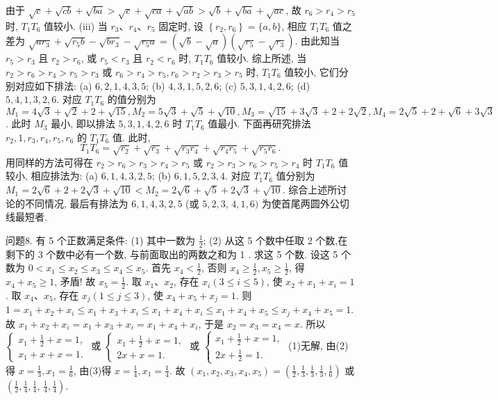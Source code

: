 由于 $\sqrt{c}+\sqrt{c b}+\sqrt{b a}>\sqrt{c}+\sqrt{c a}+\sqrt{a b}>\sqrt{b}+\sqrt{b a}+\sqrt{a c}$, 故 $r_6> r_4>r_5$ 时, $T_1 T_6$ 值较小.
(iii) 当 $r_3 、 r_4 、 r_5$ 固定时, 设 $\left\{r_2, r_6\right\}=\{a, b\}$, 相应 $T_1 T_6$ 值之差为 $\sqrt{a r_3}+\sqrt{r_5 b}-\sqrt{b r_3}-\sqrt{r_5 a}=(\sqrt{b}-\sqrt{a})\left(\sqrt{r_5}-\sqrt{r_3}\right)$.
由此知当 $r_5>r_3$ 且 $r_2>r_6$, 或 $r_5<r_3$ 且 $r_2<r_6$ 时, $T_1 T_6$ 值较小.
综上所述, 当 $r_2>r_6>r_4>r_5>r_3$ 或 $r_6>r_4>r_5, r_6>r_2>r_3>r_5$ 时, $T_1 T_6$ 值较小, 它们分别对应如下排法:
(a) $6,2,1,4,3,5$;
(b) $4,3,1,5,2,6$;
(c) $5,3,1,4,2,6$; (d) $5,4,1,3,2,6$.
对应 $T_1 T_6$ 的值分别为 $M_1=4 \sqrt{3}+\sqrt{2}+2+\sqrt{15}, M_2=5 \sqrt{3}+\sqrt{5}+ \sqrt{10}, M_3=\sqrt{15}+3 \sqrt{3}+2+2 \sqrt{2}, M_4=2 \sqrt{5}+2+\sqrt{6}+3 \sqrt{3}$.
此时 $M_3$ 最小, 即以排法 $5,3,1,4,2,6$ 时 $T_1 T_6$ 值最小.
下面再研究排法 $r_2, 1, r_3, r_4, r_5, r_6$ 的 $T_1 T_6$ 值.
此时,
$$
T_1 T_6=\sqrt{r_2}+\sqrt{r_3}+\sqrt{r_3 r_4}+\sqrt{r_4 r_5}+\sqrt{r_5 r_6} .
$$
用同样的方法可得在 $r_2>r_6>r_3>r_4>r_5$ 或 $r_2>r_3>r_6>r_5>r_4$ 时 $T_1 T_6$ 值较小, 相应排法为:
(a) $6,1,4,3,2,5$;
(b) $6,1,5,2,3,4$.
对应 $T_1 T_6$ 值分别为 $M_1=2 \sqrt{6}+2+2 \sqrt{3}+\sqrt{10}<M_2=2 \sqrt{6}+\sqrt{5}+ 2 \sqrt{3}+\sqrt{10}$.
综合上述所讨论的不同情况, 最后有排法为 $6,1,4,3,2,5$ (或 $5,2,3$, $4,1,6)$ 为使首尾两圆外公切线最短者.



问题8. 有 5 个正数满足条件:
(1) 其中一数为 $\frac{1}{2}$;
(2) 从这 5 个数中任取 2 个数,在剩下的 3 个数中必有一个数, 与前面取出的两数之和为 1 .
求这 5 个数.
设这 5 个数为 $0<x_1 \leqslant x_2 \leqslant x_3 \leqslant x_4 \leqslant x_5$.
首先 $x_4<\frac{1}{2}$, 否则 $x_4 \geqslant \frac{1}{2}, x_5 \geqslant \frac{1}{2}$, 得 $x_4+x_5 \geqslant 1$, 矛盾! 故 $x_5=\frac{1}{2}$.
取 $x_1 、 x_2$, 存在 $x_i(3 \leqslant i \leqslant 5)$, 使 $x_2+x_1+x_i=1$.
取 $x_4 、 x_5$, 存在 $x_j(1 \leqslant j \leqslant 3)$, 使 $x_4+x_5+x_j=1$.
则 $1=x_1+x_2+x_i \leqslant x_1+x_3+x_i \leqslant x_1+x_4+x_i \leqslant x_1+x_4+x_5 \leqslant x_j+ x_4+x_5=1$.
故 $x_1+x_2+x_i=x_1+x_3+x_i=x_1+x_4+x_i$, 于是 $x_2=x_3=x_4=x$.
所以 $\left\{\begin{array}{l}x_1+\frac{1}{2}+x=1, \\ x_1+x+x=1 .\end{array}\right. \label{(1)}$
或 $\left\{\begin{array}{l}x_1+\frac{1}{2}+x=1, \\ 2 x+x=1 .\end{array}\right. \label{(2)}$
或 $\left\{\begin{array}{l}x_1+\frac{1}{2}+x=1, \\ 2 x+\frac{1}{2}=1 .\end{array}\right. \label{(3)}$
(1)无解, 由(2)得 $x=\frac{1}{3}, x_1=\frac{1}{6}$, 由(3)得 $x=\frac{1}{4}, x_1=\frac{1}{4}$.
故 $\left(x_1, x_2, x_3, x_4, x_5\right)=\left(\frac{1}{2}, \frac{1}{3}, \frac{1}{3}, \frac{1}{3}, \frac{1}{6}\right)$ 或 $\left(\frac{1}{2}, \frac{1}{4}, \frac{1}{4}\right.$, $\left.\frac{1}{4}, \frac{1}{4}\right)$.



